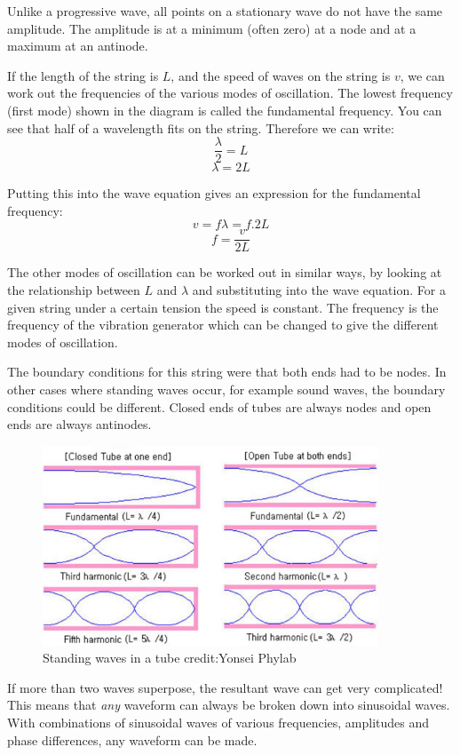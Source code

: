 \documentclass[revision-guide.tex]{subfiles}
\begin{document}
Unlike a progressive wave, all points on a stationary wave do not have the same amplitude. The amplitude is at a minimum (often zero) at a node and at a maximum at an antinode.

If the length of the string is $L$, and the speed of waves on the string is $v$, we can work out the frequencies of the various modes of oscillation. The lowest frequency (first mode) shown in the diagram is called the fundamental frequency. You can see that half of a wavelength fits on the string. Therefore we can write:
$$\frac{\lambda}{2} = L$$
$$\lambda = 2L$$

Putting this into the wave equation gives an expression for the fundamental frequency:
$$v = f\lambda = f.2L$$
$$f = \frac{v}{2L}$$

The other modes of oscillation can be worked out in similar ways, by looking at the relationship between $L$ and $\lambda$ and substituting into the wave equation. For a given string under a certain tension the speed is constant. The frequency is the frequency of the vibration generator which can be changed to give the different modes of oscillation.

The boundary conditions for this string were that both ends had to be nodes. In other cases where standing waves occur, for example sound waves, the boundary conditions could be different. Closed ends of tubes are always nodes and open ends are always antinodes.

\begin{figure}[h!]
\centering
\includegraphics[width=10cm]{figs/chapt-7/sound.JPG}
\caption{Standing waves in a tube {credit:Yonsei Phylab}}
\end{figure}


If more than two waves superpose, the resultant wave can get very complicated! This means that \emph{any} waveform can always be broken down into sinusoidal waves. With combinations of sinusoidal waves of various frequencies, amplitudes and phase differences, any waveform can be made.
\end{document}
